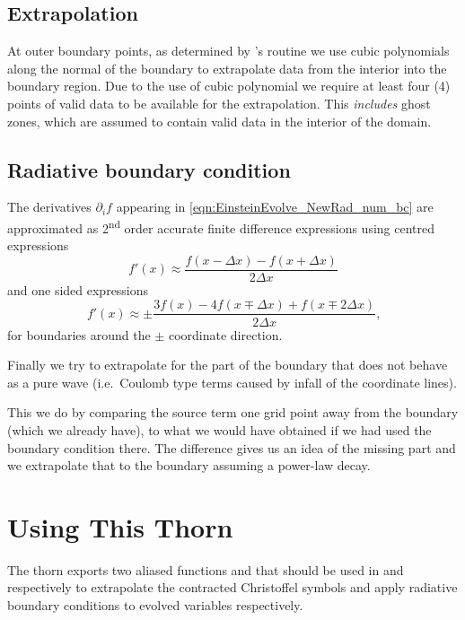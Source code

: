 \subsection{Extrapolation}
At outer boundary points, as determined by 's routine
 we use cubic polynomials along the
normal of the boundary to extrapolate data from the interior into the
boundary region. Due to the use of cubic polynomial we require at least
four (4) points of valid data to be available for the extrapolation.
This \emph{includes} ghost zones, which are assumed to contain valid
data in the interior of the domain. 

\subsection{Radiative boundary condition}
The derivatives $\partial_i f$ appearing in
\eqref{eqn:EinsteinEvolve_NewRad_num_bc} are approximated as
2\textsuperscript{nd} order accurate finite difference expressions using
centred expressions
\begin{equation}
f'(x) \approx \frac{f(x-\Delta x) - f(x+\Delta x)}{2\Delta x}
\end{equation}
and one sided expressions
\begin{equation}
f'(x) \approx \pm\frac{3 f(x) - 4 f(x\mp\Delta x) + f(x\mp2\Delta
x)}{2\Delta x}\mbox{,}
\end{equation}
for boundaries around the $\pm$ coordinate direction. 

Finally we try to extrapolate for the part of the boundary
that does not behave as a pure wave (i.e.\ Coulomb type
terms caused by infall of the coordinate lines).

This we do by comparing the source term one grid point
away from the boundary (which we already have), to what
we would have obtained if we had used the boundary
condition there.  The difference gives us an idea of the
missing part and we extrapolate that to the boundary
assuming a power-law decay.

\section{Using This Thorn}
The thorn exports two aliased functions  and
 that should be used in  and
 respectively to extrapolate the contracted
Christoffel symbols and apply radiative boundary conditions to evolved
variables respectively.

